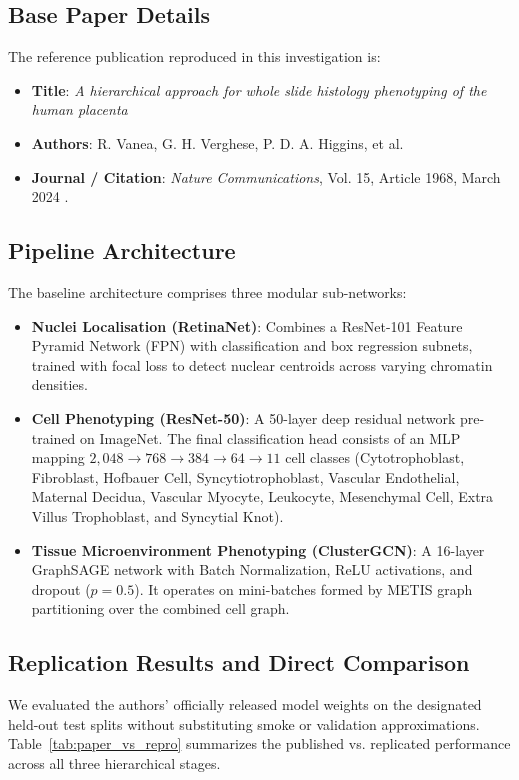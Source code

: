 \documentclass[a4paper,fleqn]{cas-sc}
\begin{document}
\subsection{Base Paper Details}
The reference publication reproduced in this investigation is:
\begin{itemize}
    \item \textbf{Title}: \textit{A hierarchical approach for whole slide histology phenotyping of the human placenta}
    \item \textbf{Authors}: R. Vanea, G. H. Verghese, P. D. A. Higgins, et al.
    \item \textbf{Journal / Citation}: \textit{Nature Communications}, Vol. 15, Article 1968, March 2024 \cite{vanea2024hierarchical}.
\end{itemize}

\subsection{Pipeline Architecture}
The baseline architecture comprises three modular sub-networks:
\begin{itemize}
    \item \textbf{Nuclei Localisation (RetinaNet)}: Combines a ResNet-101 Feature Pyramid Network (FPN) with classification and box regression subnets, trained with focal loss to detect nuclear centroids across varying chromatin densities.
    \item \textbf{Cell Phenotyping (ResNet-50)}: A 50-layer deep residual network \cite{he2016deep} pre-trained on ImageNet. The final classification head consists of an MLP mapping $2,048 \rightarrow 768 \rightarrow 384 \rightarrow 64 \rightarrow 11$ cell classes (Cytotrophoblast, Fibroblast, Hofbauer Cell, Syncytiotrophoblast, Vascular Endothelial, Maternal Decidua, Vascular Myocyte, Leukocyte, Mesenchymal Cell, Extra Villus Trophoblast, and Syncytial Knot).
    \item \textbf{Tissue Microenvironment Phenotyping (ClusterGCN)}: A 16-layer GraphSAGE network \cite{chiang2019cluster} with Batch Normalization, ReLU activations, and dropout ($p=0.5$). It operates on mini-batches formed by METIS graph partitioning over the combined cell graph.
\end{itemize}

\subsection{Replication Results and Direct Comparison}
We evaluated the authors' officially released model weights on the designated held-out test splits without substituting smoke or validation approximations. Table~\ref{tab:paper_vs_repro} summarizes the published vs. replicated performance across all three hierarchical stages.
\end{document}
